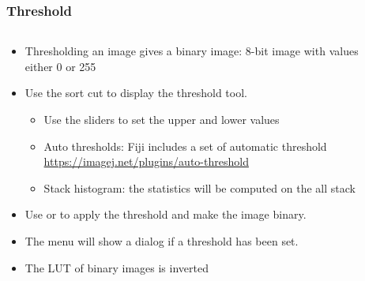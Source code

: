 \documentclass[ignorenonframetext,aspectratio=169,10pt,xcolor=table]{beamer}
\begin{document}
\begin{frame} \frametitle{Threshold}
  \begin{columns}
    \begin{column}{0.7\textwidth}
      \begin{itemize} \setlength\itemsep{1em}
      \item Thresholding an image gives a binary image: 8-bit image with
        values either 0 or 255
      \item Use the sort cut  to display the threshold
        tool.
        \begin{itemize}
        \item Use the sliders to set the upper and lower values
        \item Auto thresholds: Fiji includes a set of automatic threshold
          \url{https://imagej.net/plugins/auto-threshold}
        \item Stack histogram: the statistics will be computed on the all
          stack
        \end{itemize}
      \item Use  or  to
        apply the threshold and make the image binary.
      \item The menu  will show a dialog
        if a threshold has been set.
      \item The LUT of binary images is inverted
      \end{itemize}
    \end{column}
    \begin{column}{0.3\textwidth} \centering

\end{column}
\end{columns}
\end{frame}
\end{document}
